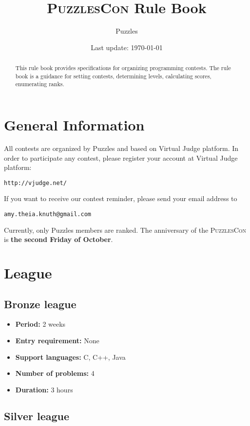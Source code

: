 \documentclass{article}
\title{\textsc{PuzzlesCon} \textbf{Rule Book}}
\author{Puzzles}
\date{Last update: \today}
\begin{document}
\maketitle

\begin{abstract}
This rule book provides specifications for organizing programming contests. The rule book is a guidance for setting contests, determining levels, calculating scores, enumerating ranks.
\end{abstract}

\tableofcontents

\section{General Information}

All contests are organized by Puzzles and based on Virtual Judge platform. In order to participate any contest, please register your account at Virtual Judge platform:
\begin{verbatim}
http://vjudge.net/
\end{verbatim}
If you want to receive our contest reminder, please send your email address to
\begin{verbatim}
amy.theia.knuth@gmail.com
\end{verbatim}

Currently, only Puzzles members are ranked. The anniversary of the \textsc{PuzzlesCon} is \textbf{the second Friday of October}.

\clearpage
\section{League}

\subsection{Bronze league}

\begin{itemize}
	\item \textbf{Period:} 2 weeks
	\item \textbf{Entry requirement:} None
	\item \textbf{Support languages:} C, C++, Java
	\item \textbf{Number of problems:} 4
	\item \textbf{Duration:} 3 hours
\end{itemize}

\subsection{Silver league}
\end{document}

